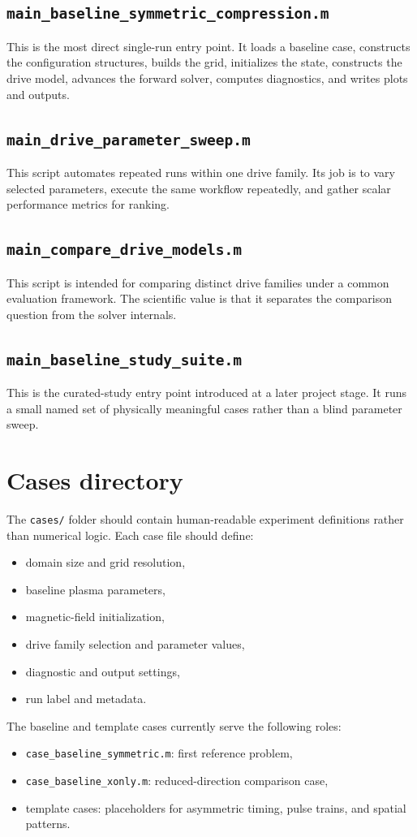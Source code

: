 \documentclass[11pt]{article}
\begin{document}
\subsection{\texttt{main\_baseline\_symmetric\_compression.m}}
This is the most direct single-run entry point. It loads a baseline case, constructs the configuration structures, builds the grid, initializes the state, constructs the drive model, advances the forward solver, computes diagnostics, and writes plots and outputs.

\subsection{\texttt{main\_drive\_parameter\_sweep.m}}
This script automates repeated runs within one drive family. Its job is to vary selected parameters, execute the same workflow repeatedly, and gather scalar performance metrics for ranking.

\subsection{\texttt{main\_compare\_drive\_models.m}}
This script is intended for comparing distinct drive families under a common evaluation framework. The scientific value is that it separates the comparison question from the solver internals.

\subsection{\texttt{main\_baseline\_study\_suite.m}}
This is the curated-study entry point introduced at a later project stage. It runs a small named set of physically meaningful cases rather than a blind parameter sweep.

\section{Cases directory}
The \texttt{cases/} folder should contain human-readable experiment definitions rather than numerical logic. Each case file should define:
\begin{itemize}[leftmargin=1.8em]
    \item domain size and grid resolution,
    \item baseline plasma parameters,
    \item magnetic-field initialization,
    \item drive family selection and parameter values,
    \item diagnostic and output settings,
    \item run label and metadata.
\end{itemize}
The baseline and template cases currently serve the following roles:
\begin{itemize}[leftmargin=1.8em]
    \item \texttt{case\_baseline\_symmetric.m}: first reference problem,
    \item \texttt{case\_baseline\_xonly.m}: reduced-direction comparison case,
    \item template cases: placeholders for asymmetric timing, pulse trains, and spatial patterns.
\end{itemize}
\end{document}
